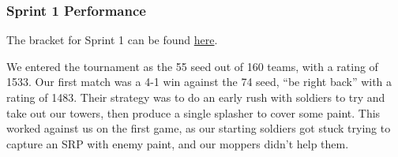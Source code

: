 \subsubsection{Sprint 1 Performance}

The bracket for Sprint 1 can be found \href{https://challonge.com/bc25javasprint1}{here}.

\medskip

We entered the tournament as the 55 seed out of 160 teams, with a rating of 1533. Our first match was a 4-1 win against the 74 seed, ``be right back'' with a rating of 1483. Their strategy was to do an early rush with soldiers to try and take out our towers, then produce a single splasher to cover some paint. This worked against us on the first game, as our starting soldiers got stuck trying to capture an SRP with enemy paint, and our moppers didn't help them.

\medskip


